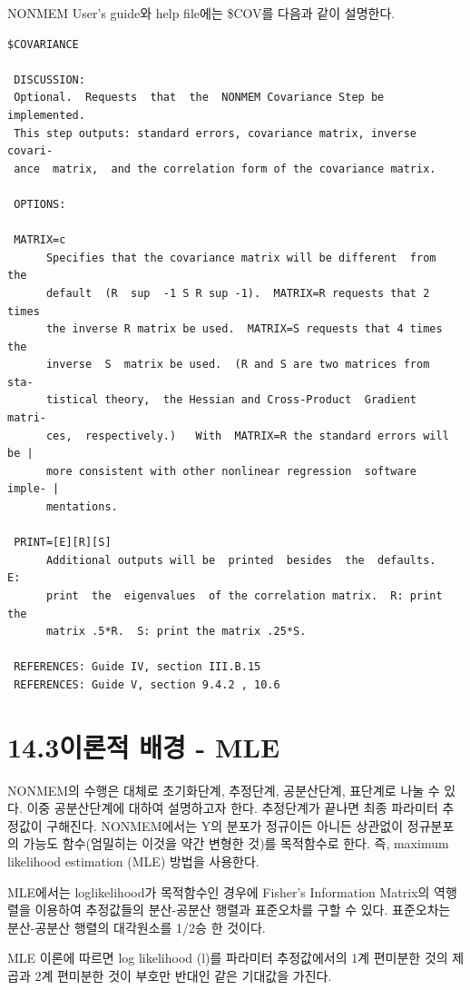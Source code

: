 \documentclass[
  10pt,
]{krantz}
\begin{document}
NONMEM User's guide와 help file에는 \$COV를 다음과 같이 설명한다.

\begin{verbatim}
$COVARIANCE

 DISCUSSION:
 Optional.  Requests  that  the  NONMEM Covariance Step be implemented.
 This step outputs: standard errors, covariance matrix, inverse covari-
 ance  matrix,  and the correlation form of the covariance matrix.

 OPTIONS:

 MATRIX=c
      Specifies that the covariance matrix will be different  from  the
      default  (R  sup  -1 S R sup -1).  MATRIX=R requests that 2 times
      the inverse R matrix be used.  MATRIX=S requests that 4 times the
      inverse  S  matrix be used.  (R and S are two matrices from  sta-
      tistical theory,  the Hessian and Cross-Product  Gradient  matri-
      ces,  respectively.)   With  MATRIX=R the standard errors will be |
      more consistent with other nonlinear regression  software  imple- |
      mentations.

 PRINT=[E][R][S]
      Additional outputs will be  printed  besides  the  defaults.   E:
      print  the  eigenvalues  of the correlation matrix.  R: print the
      matrix .5*R.  S: print the matrix .25*S.

 REFERENCES: Guide IV, section III.B.15
 REFERENCES: Guide V, section 9.4.2 , 10.6
\end{verbatim}

\hypertarget{uxc774uxb860uxc801-uxbc30uxacbd---mle}{%
\section{14.3이론적 배경 - MLE}\label{uxc774uxb860uxc801-uxbc30uxacbd---mle}}

NONMEM의 수행은 대체로 초기화단계, 추정단계, 공분산단계, 표단계로 나눌 수 있다. 이중 공분산단계에 대하여 설명하고자
한다. 추정단계가 끝나면 최종 파라미터 추정값이 구해진다. NONMEM에서는 Y의 분포가 정규이든 아니든 상관없이
정규분포의 가능도 함수(엄밀히는 이것을 약간 변형한 것)를 목적함수로 한다. 즉, maximum
likelihood estimation (MLE) 방법을 사용한다.

MLE에서는 loglikelihood가 목적함수인 경우에 Fisher's Information Matrix의 역행렬을 이용하여
추정값들의 분산-공분산 행렬과 표준오차를 구할 수 있다. 표준오차는 분산-공분산 행렬의 대각원소를 1/2승 한 것이다.

MLE 이론에 따르면 log likelihood (l)를 파라미터 추정값에서의 1계 편미분한 것의 제곱과 2계 편미분한 것이
부호만 반대인 같은 기대값을 가진다.
\end{document}
